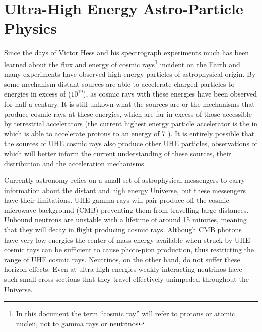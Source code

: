 \chapter{Ultra-High Energy Astro-Particle Physics}
\label{chap:uhe-app}

Since the days of Victor Hess and his spectrograph experiments much has been learned about the flux and energy of cosmic rays\footnote{In this document the term ``cosmic ray'' will refer to protons or atomic nucleii, not to gamma rays or neutrinos} incident on the Earth and many experiments have observed high energy particles of astrophysical origin. By some mechanism distant sources are able to accelerate charged particles to energies in excess of \EeV ($10^{19}$\eV), as cosmic rays with these energies have been observed for half a century. It is still unkown what the sources are or the mechanisms that produce cosmic rays at these energies, which are far in excess of those accessible by terrestrial accelerators (the current highest energy particle accelerator is the \LHC in \CERN which is able to accelerate protons to an energy of 7 \TeV). It is entirely possible that the sources of UHE cosmic rays also produce other UHE particles, observations of which will better inform the current understanding of these sources, their distribution and the acceleration mechanisms.



Currently astronomy relies on a small set of astrophysical messengers to carry information about the distant and high energy Universe, but these messengers have their limitations. UHE gamma-rays 
will pair produce \Pelectron\Ppositron off the cosmic microwave background (CMB) preventing them from travelling large distances. Unbound neutrons are unstable with a lifetime of around 15 minutes, meaning that they will decay in flight producing cosmic rays. Although CMB photons have very low energies the center of mass energy available when struck by UHE cosmic rays can be sufficient to cause photo-pion production, thus restricting the range of UHE cosmic rays. Neutrinos, on the other hand, do not suffer these horizon effects. Even at ultra-high energies weakly interacting neutrinos have such small cross-sections that they travel effectively unimpeded throughout the Universe. 

